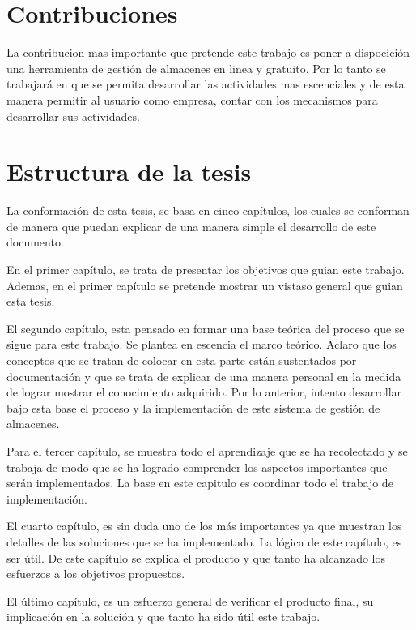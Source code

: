 \section{Contribuciones}

La contribucion mas importante que pretende este trabajo es poner a dispocición una herramienta de gestión de almacenes en linea y gratuito. Por lo tanto se trabajará en que se permita desarrollar las actividades mas escenciales y de esta manera permitir al usuario como empresa, contar con los mecanismos para desarrollar sus actividades.


\section{Estructura de la tesis}

La conformación de esta tesis, se basa en cinco capítulos, los cuales se conforman de manera que puedan explicar de una manera simple el desarrollo de este documento.

En el primer capítulo, se trata de presentar los objetivos que guian este trabajo. Ademas, en el primer capítulo se pretende mostrar un vistaso general que guian esta tesis.

El segundo capítulo, esta pensado en formar una base teórica del proceso que se sigue para este trabajo. Se plantea en escencia el marco teórico. Aclaro que los conceptos que se tratan de colocar en esta parte están sustentados por documentación y que se trata de explicar de una manera personal en la medida de lograr mostrar el conocimiento adquirido. Por lo anterior, intento desarrollar bajo esta base el proceso y la implementación de este sistema de gestión de almacenes.

Para el tercer capítulo, se muestra todo el aprendizaje que se ha recolectado y se trabaja de modo que se ha logrado comprender los aspectos importantes que serán implementados. La base en este capitulo es coordinar todo el trabajo de implementación.

El cuarto capítulo, es sin duda uno de los más importantes ya que muestran los detalles de las soluciones que se ha implementado. La lógica de este capítulo, es ser útil. De este capítulo se explica el producto y que tanto ha alcanzado los esfuerzos a los objetivos propuestos.

El último capítulo, es un esfuerzo general de verificar el producto final, su implicación en la solución y que tanto ha sido útil este trabajo.
